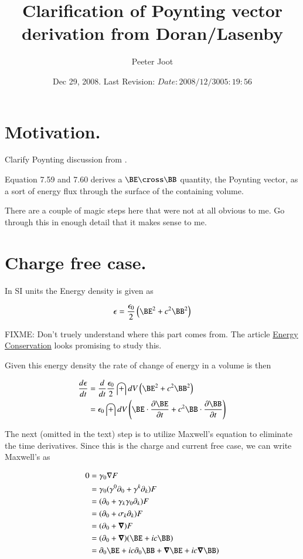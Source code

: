 \documentclass{article}
\title{ Clarification of Poynting vector derivation from Doran/Lasenby }
\author{Peeter Joot}
\date{ Dec 29, 2008.  Last Revision: $Date: 2008/12/30 05:19:56 $ }
\begin{document}
\maketitle{}


\section{ Motivation. }

Clarify Poynting discussion from \cite{doran2003gap}.

Equation 7.59 and 7.60 derives a $\BE \cross \BB$ quantity, the Poynting vector, as a sort of energy flux through the surface of the containing volume.

There are a couple of magic steps here that were not at all obvious to me.  Go through this in enough detail that it makes sense to me.

\section{ Charge free case. }

In SI units the Energy density is given as

\begin{align*}
\epsilon = \frac{\epsilon_0}{2}\left( \BE^2 + c^2 \BB^2 \right)
\end{align*}

FIXME: Don't truely understand where this part comes from.  The article \href{http://farside.ph.utexas.edu/teaching/em/lectures/node89.html}{Energy Conservation} looks promising to study this.

Given this energy density the rate of change of energy in a volume is then

\begin{align*}
\frac{d\epsilon}{dt} 
&= 
\frac{d}{dt} 
\frac{\epsilon_0}{2} \int dV \left( \BE^2 + c^2 \BB^2 \right) \\
&= 
\epsilon_0 \int dV \left( \BE \cdot \PD{t}{\BE} + c^2 \BB \cdot \PD{t}{\BB} \right) \\
\end{align*}

The next (omitted in the text) step is to utilize Maxwell's equation to eliminate the time derivatives.  Since this is the
charge and current free case, we can write Maxwell's as

\begin{align*}
0
&= \gamma_0 \grad F \\
&= \gamma_0 (\gamma^0 \partial_0 + \gamma^k \partial_k) F \\
&= (\partial_0 + \gamma_k\gamma_0 \partial_k) F \\
&= (\partial_0 + \sigma_k \partial_k) F \\
&= (\partial_0 + \spacegrad)F \\
&= (\partial_0 + \spacegrad)(\BE + ic \BB) \\
&= \partial_0 \BE + ic \partial_0 \BB + \spacegrad \BE + ic \spacegrad \BB) \\
\end{align*}
\end{document}
